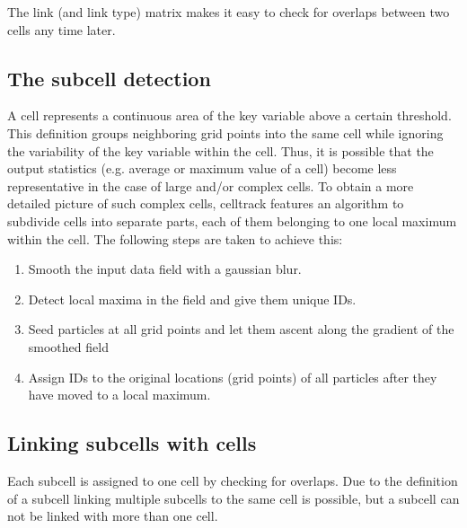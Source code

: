 \documentclass{scrartcl}
\begin{document}
The link (and link type) matrix makes it easy to check for overlaps between two cells any time later.

\subsection{The subcell detection}
\label{sec:detectsubcells}
A cell represents a continuous area of the key variable above a certain threshold. This definition groups neighboring grid points into the same cell while ignoring the variability of the key variable within the cell. Thus, it is possible that the output statistics (e.g. average or maximum value of a cell) become less representative in the case of large and/or complex cells. To obtain a more detailed picture of such complex cells, celltrack features an algorithm to subdivide cells into separate parts, each of them belonging to one local maximum within the cell.
The following steps are taken to achieve this:
\begin{enumerate}
	\item Smooth the input data field with a gaussian blur.
	\item Detect local maxima in the field and give them unique IDs.
	\item Seed particles at all grid points and let them ascent along the gradient of the smoothed field
	\item Assign IDs to the original locations (grid points) of all particles after they have moved to a local maximum.
\end{enumerate}

\subsection{Linking subcells with cells}
Each subcell is assigned to one cell by checking for overlaps. Due to the definition of a subcell linking multiple subcells to the same cell is possible, but a subcell can not be linked with more than one cell.
\end{document}
